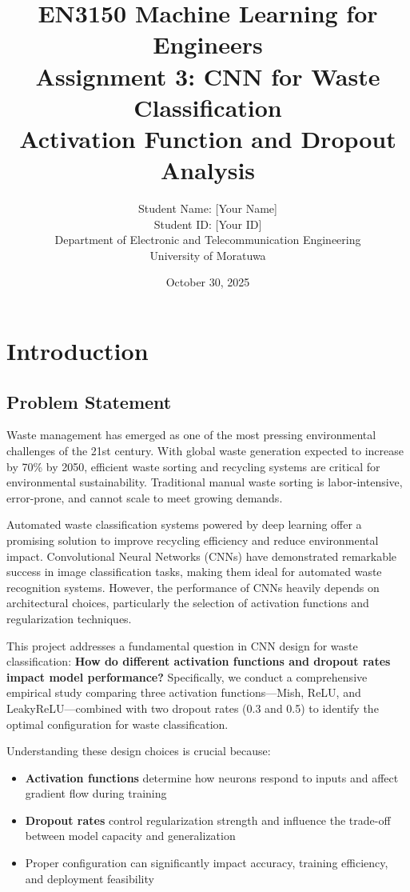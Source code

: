 \documentclass[12pt,a4paper]{article}
\title{\textbf{EN3150 Machine Learning for Engineers\\
Assignment 3: CNN for Waste Classification\\
Activation Function and Dropout Analysis}}
\author{Student Name: [Your Name]\\
Student ID: [Your ID]\\
Department of Electronic and Telecommunication Engineering\\
University of Moratuwa}
\date{October 30, 2025}
\begin{document}
\maketitle
\newpage

\tableofcontents
\newpage

\section{Introduction}

\subsection{Problem Statement}

Waste management has emerged as one of the most pressing environmental challenges of the 21st century. With global waste generation expected to increase by 70\% by 2050, efficient waste sorting and recycling systems are critical for environmental sustainability. Traditional manual waste sorting is labor-intensive, error-prone, and cannot scale to meet growing demands.

Automated waste classification systems powered by deep learning offer a promising solution to improve recycling efficiency and reduce environmental impact. Convolutional Neural Networks (CNNs) have demonstrated remarkable success in image classification tasks, making them ideal for automated waste recognition systems. However, the performance of CNNs heavily depends on architectural choices, particularly the selection of activation functions and regularization techniques.

This project addresses a fundamental question in CNN design for waste classification: \textbf{How do different activation functions and dropout rates impact model performance?} Specifically, we conduct a comprehensive empirical study comparing three activation functions—Mish, ReLU, and LeakyReLU—combined with two dropout rates (0.3 and 0.5) to identify the optimal configuration for waste classification.

Understanding these design choices is crucial because:
\begin{itemize}
    \item \textbf{Activation functions} determine how neurons respond to inputs and affect gradient flow during training
    \item \textbf{Dropout rates} control regularization strength and influence the trade-off between model capacity and generalization
    \item Proper configuration can significantly impact accuracy, training efficiency, and deployment feasibility
\end{itemize}
\end{document}
